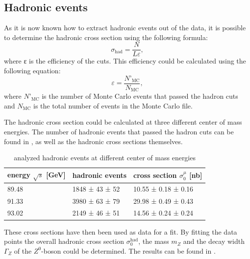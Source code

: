 \documentclass[epj,nopacs]{svjour}
\begin{document}
\subsection{Hadronic events}
As it is now known how to extract hadronic events out of the data, it is
possible to determine the hadronic cross section using the following formula:
\begin{equation}
σ_{\mathrm{had}} = \frac{N}{Lε},
\end{equation}
where ε is the efficiency of the cuts. This efficiency could be calculated
using the following equation:
\begin{equation}
ε = \frac{N’_{\mathrm{MC}}}{N_{\mathrm{MC}}},
\end{equation}
where $N’_{\mathrm{MC}}$ is the number of Monte Carlo events that passed the
hadron cuts and $N_{\mathrm{MC}}$ is the total number of events in the Monte
Carlo file.

The hadronic cross section could be calculated at three different center of
mass energies. The number of hadronic events that passed the hadron cuts can be
found in , as well as the hadronic cross sections themselves.

\begin{table}[h]
\begin{center}
\begin{tabular}{|l|l|l|}
\hline
energy $\sqrt{s}$ [\si{\GeV}] & hadronic events & cross section $σ_0^μ$ [\si{\nano\barn}]\\
\hline
89.48 & 1848 ± 43 ± 52 & 10.55 ± 0.18 ± 0.16 \\
91.33 & 3980 ± 63 ± 79 & 29.98 ± 0.49 ± 0.43 \\
93.02 & 2149 ± 46 ± 51 & 14.56 ± 0.24 ± 0.24 \\
\hline
\end{tabular}
\vspace*{0.3cm}
\caption{\baselineskip=0.38cm analyzed hadronic events at different center of mass energies}
\label{tab:hadr_events}
\end{center}
\vspace*{-0.5cm}
\end{table}

These cross sections have then been used as data for a fit. By fitting the data
points the overall hadronic cross section $σ_0^{\mathrm{had}}$, the mass $m_Z$ and the decay width $Γ_Z$
of the $Z^0$-boson could be determined. The results can be found in
.
\end{document}
